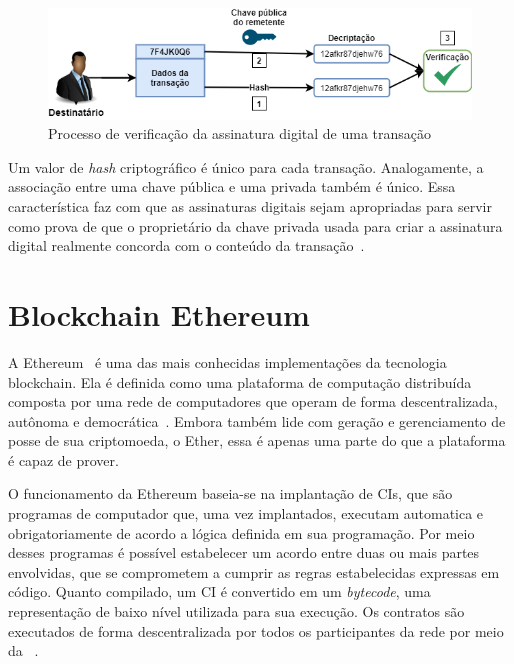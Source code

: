\begin{figure}[htb]
 \caption{Processo de verificação da assinatura digital de uma transação}
 \label{fig:verifica-assinatura-digital}
 \centering
 \includegraphics[scale=0.5]{figuras/verifica_assinatura_digital.png}
\end{figure}

Um valor de \textit{hash} criptográfico é único para cada transação. Analogamente, a associação entre uma chave pública e uma privada também é único. Essa característica faz com que as assinaturas digitais sejam apropriadas para servir como prova de que o proprietário da chave privada usada para criar a assinatura digital realmente concorda com o conteúdo da transação~\cite{overview-blockchainbasic2018drescher}.

\section{Blockchain Ethereum} \label{tex:fund:ethereum}


A Ethereum~\cite{ethereum2014whitepaper} é uma das mais conhecidas implementações da tecnologia blockchain. Ela é definida como uma plataforma de computação distribuída composta por uma rede de computadores que operam de forma descentralizada, autônoma e democrática~\cite{wood2014ethereum-yellow-paper}. Embora também lide com geração e gerenciamento de posse de sua criptomoeda, o Ether, essa é apenas uma parte do que a plataforma é capaz de prover.

O funcionamento da Ethereum baseia-se na implantação de CIs, que são programas de computador que, uma vez implantados, executam automatica e obrigatoriamente  de acordo a lógica definida em sua programação. Por meio desses programas é possível estabelecer um acordo entre duas ou mais partes envolvidas, que se comprometem a cumprir as regras estabelecidas expressas em código. Quanto compilado, um CI é convertido em um \textit{bytecode}, uma representação de baixo nível utilizada para sua execução. Os contratos são executados de forma descentralizada por todos os participantes da rede por meio da ~\cite{overview-chen2020blockchain-graph}.

